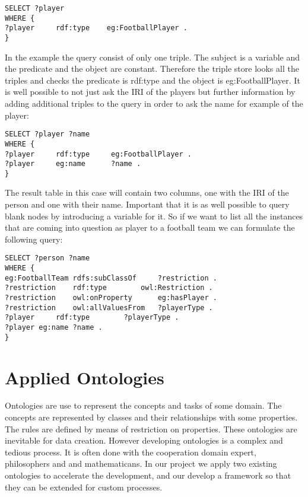 \begin{lstlisting}[captionpos=b, caption=SPARQL Query I., label=lst:sparql,
basicstyle=\footnotesize,frame=single]
SELECT ?player  
WHERE { 
?player		rdf:type	eg:FootballPlayer .	
}
\end{lstlisting}

In the example the query consist of only one triple. The subject is a variable and the predicate and the object are constant. Therefore the triple store looks all the triples and checks the predicate is rdf:type and the object is eg:FootballPlayer. 
It is well possible to not just ask the IRI of the players but further information by adding additional triples to the query in order to ask the name for example of the player:

\begin{lstlisting}[captionpos=b, caption=SPARQL Query II., label=2nd:sparql,
basicstyle=\footnotesize,frame=single]
SELECT ?player ?name 
WHERE { 
?player		rdf:type	 eg:FootballPlayer .	
?player		eg:name		 ?name .
}
\end{lstlisting}

The result table in this case will contain two columns, one with the IRI of the person and one with their name. Important that it is as well possible to query blank nodes by introducing a variable for it. So if we want to list all the instances that are coming into question as player to a football team we can formulate the following query:

\begin{lstlisting}[captionpos=b, caption=SPARQL Query III., label=3rd:sparql,
basicstyle=\footnotesize,frame=single]
SELECT ?person ?name
WHERE {
eg:FootballTeam	rdfs:subClassOf		?restriction .
?restriction	rdf:type		owl:Restriction .
?restriction	owl:onProperty		eg:hasPlayer .
?restriction	owl:allValuesFrom	?playerType .
?player		rdf:type		?playerType .
?player	eg:name	?name . 
}
\end{lstlisting}


\section{Applied Ontologies}


Ontologies are use to represent the concepts and tasks of some domain. The concepts are represented by classes and their relationships with some properties.
The rules are defined by means of restriction on properties. These ontologies are inevitable for data creation. However developing ontologies is a complex and tedious process. It is often done with the cooperation domain expert, philosophers and and mathematicans. In our project we apply two existing ontologies to accelerate the development, and our develop a framework so that they can be extended for custom processes.

